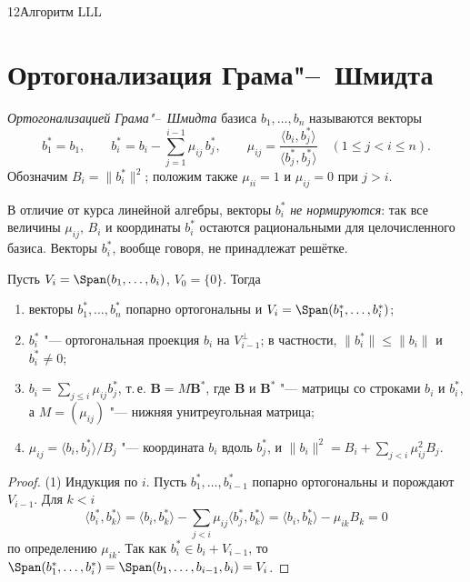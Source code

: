\begin{lecture}{12}{Алгоритм LLL}
\section{Ортогонализация Грама"--~Шмидта}

\begin{definition}\label{l12:gs}
\emph{Ортогонализацией Грама"--~Шмидта} базиса $b_1, \dots, b_n$ называются векторы
\[
  b_1^* = b_1, \qquad
  b_i^* = b_i - \sum_{j=1}^{i-1} \mu_{ij}\, b_j^*, \qquad
  \mu_{ij} = \frac{\langle b_i, b_j^* \rangle}{\langle b_j^*, b_j^*\rangle}
  \quad (1 \le j < i \le n).
\]
Обозначим $B_i = \|b_i^*\|^2$; положим также $\mu_{ii} = 1$ и $\mu_{ij} = 0$ при $j > i$.
\end{definition}

В отличие от курса линейной алгебры, векторы $b_i^*$ \emph{не нормируются}: так все величины
$\mu_{ij}$, $B_i$ и координаты $b_i^*$ остаются рациональными для целочисленного базиса.
Векторы $b_i^*$, вообще говоря, не принадлежат решётке.

\begin{lemma}\label{l12:gsprops}
Пусть $V_i = \Span(b_1, \dots, b_i)$, $V_0 = \{0\}$. Тогда
\begin{enumerate}
  \item векторы $b_1^*, \dots, b_n^*$ попарно ортогональны и $V_i = \Span(b_1^*, \dots, b_i^*)$;
  \item $b_i^*$ "--- ортогональная проекция $b_i$ на $V_{i-1}^\perp$; в частности,
    $\|b_i^*\| \le \|b_i\|$ и $b_i^* \ne 0$;
  \item $b_i = \sum_{j \le i} \mu_{ij} b_j^*$, т.\,е. $\mathbf{B} = M \mathbf{B}^*$, где
    $\mathbf{B}$ и $\mathbf{B}^*$ "--- матрицы со строками $b_i$ и $b_i^*$, а
    $M = (\mu_{ij})$ "--- нижняя унитреугольная матрица;
  \item $\mu_{ij} = \langle b_i, b_j^*\rangle / B_j$ "--- координата $b_i$ вдоль $b_j^*$, и
    $\|b_i\|^2 = B_i + \sum_{j<i} \mu_{ij}^2 B_j$.
\end{enumerate}
\end{lemma}

\begin{proof}
(1) Индукция по $i$. Пусть $b_1^*, \dots, b_{i-1}^*$ попарно ортогональны и порождают
$V_{i-1}$. Для $k < i$
\[
  \langle b_i^*, b_k^*\rangle = \langle b_i, b_k^* \rangle - \sum_{j<i} \mu_{ij}
  \langle b_j^*, b_k^*\rangle = \langle b_i, b_k^* \rangle - \mu_{ik} B_k = 0
\]
по определению $\mu_{ik}$. Так как $b_i^* \in b_i + V_{i-1}$, то
$\Span(b_1^*, \dots, b_i^*) = \Span(b_1, \dots, b_{i-1}, b_i) = V_i$.


\end{proof}
\end{lecture}
